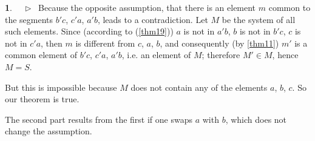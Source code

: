 \documentclass[leqno,hidelinks,a4paper]{article}
\theoremstyle{definition}
\newtheorem{satz}{\protect\satzname}
\newcommand{\satzname}{}
\renewcommand{\satzname}{\hspace{-4pt}.\ Satz}%
\renewcommand{\satzname}{\hspace{-4pt}.\ Theorem}%
\newcommand\beweis{ $ \phantom{'.'} \rhd \ $}%
\newcommand{\partof}{\in}
\begin{document}
\begin{paracol}{2}
\begin{satz}
\noindent \beweis
Because the opposite assumption, that there is an element $m$ common to the segments
$b'c$, $c'a$, $a'b$, leads to a contradiction. Let $M$ be the system of all such
elements. Since (according to (\ref{thm19})) $a$ is not in $a'b$, $b$ is not in $b'c$,
$c$ is not in $c'a$, then $m$ is different from $c$, $a$, $b$, and consequently
(by \ref{thm11}) $m'$ is a common element of $b'c$, $c'a$, $a'b$, i.e. an element
of $M$; therefore $M' \partof M$, hence  $M=S$.

But this is impossible because $M$ does not contain any of the elements $a$, $b$,
$c$. So our theorem is true.

The second part results from the first if one swaps $a$ with $b$, which does not
change the assumption.
\end{satz}


\end{paracol}
\end{document}
